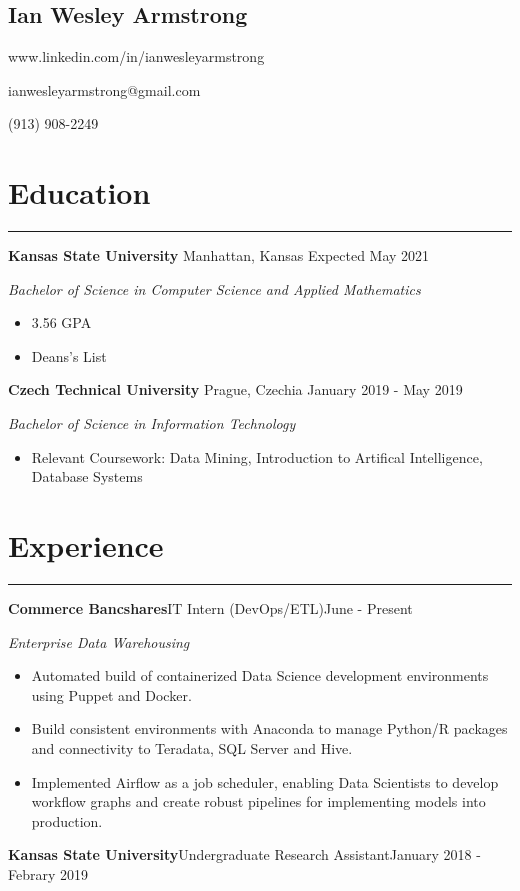 \documentclass[11pt]{article}
\newcommand{\name}[1]{\begin{center}\section*{\huge #1}\end{center}}
\newcommand{\topinfo}[1]{\begin{center}\vspace{-0.2cm}#1\vspace{-0.2cm}\end{center}}
\newcommand{\resumesection}[1]{\vspace{-0.2cm}\section*{#1}\vspace{-0.2cm}\hrule\vspace{0.2cm}}
\begin{document}
\name{Ian Wesley Armstrong}
\topinfo{www.linkedin.com/in/ianwesleyarmstrong}
\topinfo{ianwesleyarmstrong@gmail.com}
\topinfo{(913) 908-2249}

\resumesection{Education}
\textbf{Kansas State University} \hfill Manhattan, Kansas \hfill Expected May 2021  

\textit{Bachelor of Science in Computer Science and Applied Mathematics}
\begin{itemize}
	\item 3.56 GPA
	\item Deans's List
\end{itemize}

\textbf{Czech Technical University} \hfill Prague, Czechia \hfill January 2019 - May 2019 

\textit{Bachelor of Science in Information Technology }
\begin{itemize}
	\item Relevant Coursework: Data Mining, Introduction to Artifical Intelligence, Database Systems
\end{itemize}

\resumesection{Experience}
\textbf{Commerce Bancshares}\hfill{IT Intern (DevOps/ETL)}\hfill{June - Present} 

\textit{Enterprise Data Warehousing}
\begin{itemize}
	\item Automated build of containerized Data Science development environments using Puppet and Docker.
	\item Build consistent environments with Anaconda to manage Python/R packages and connectivity to Teradata, SQL Server and Hive.
	\item Implemented Airflow as a job scheduler, enabling Data Scientists to develop workflow graphs and create robust pipelines for implementing models into production.
\end{itemize}

\textbf{Kansas State University}\hfill{Undergraduate Research Assistant}\hfill{January 2018 - Febrary 2019} 
\end{document}
